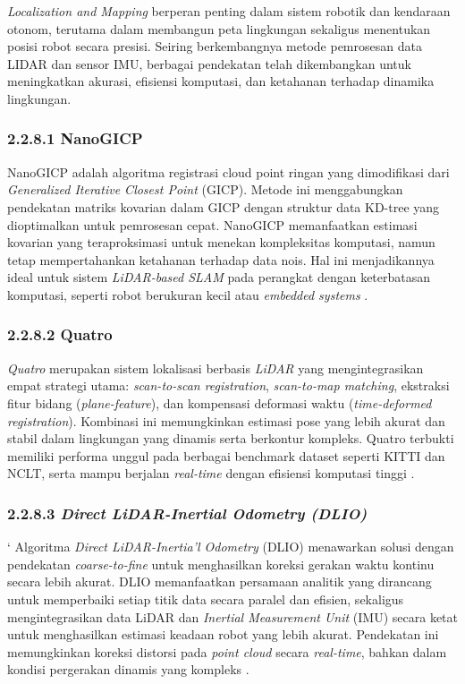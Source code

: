  \textit{ Localization and Mapping} berperan penting dalam sistem robotik dan kendaraan otonom, terutama dalam membangun peta lingkungan sekaligus menentukan posisi robot secara presisi. Seiring berkembangnya metode pemrosesan data LIDAR dan sensor IMU, berbagai pendekatan telah dikembangkan untuk meningkatkan akurasi, efisiensi komputasi, dan ketahanan terhadap dinamika lingkungan. 

\subsubsection{2.2.8.1 NanoGICP}

NanoGICP adalah algoritma registrasi cloud point ringan yang dimodifikasi dari \emph{Generalized Iterative Closest Point} (GICP). Metode ini menggabungkan pendekatan matriks kovarian dalam GICP dengan struktur data KD-tree yang dioptimalkan untuk pemrosesan cepat. NanoGICP memanfaatkan estimasi kovarian yang teraproksimasi untuk menekan kompleksitas komputasi, namun tetap mempertahankan ketahanan terhadap data nois. Hal ini menjadikannya ideal untuk sistem \emph{LiDAR-based SLAM} pada perangkat dengan keterbatasan komputasi, seperti robot berukuran kecil atau \emph{embedded systems} \cite{koide2021nanogicp}.


\subsubsection{2.2.8.2 Quatro}

\emph{Quatro} merupakan sistem lokalisasi berbasis \emph{LiDAR} yang mengintegrasikan empat strategi utama: \emph{scan-to-scan registration}, \emph{scan-to-map matching}, ekstraksi fitur bidang (\emph{plane-feature}), dan kompensasi deformasi waktu (\emph{time-deformed registration}). Kombinasi ini memungkinkan estimasi pose yang lebih akurat dan stabil dalam lingkungan yang dinamis serta berkontur kompleks. Quatro terbukti memiliki performa unggul pada berbagai benchmark dataset seperti KITTI dan NCLT, serta mampu berjalan \emph{real-time} dengan efisiensi komputasi tinggi \cite{kim2022quatro}.

\subsubsection{2.2.8.3 \emph{Direct LiDAR-Inertial Odometry (DLIO)}}`
Algoritma \emph{Direct LiDAR-Inertia'l Odometry} (DLIO) menawarkan solusi dengan pendekatan \emph{coarse-to-fine} untuk menghasilkan koreksi gerakan waktu kontinu secara lebih akurat. DLIO memanfaatkan persamaan analitik yang dirancang untuk memperbaiki setiap titik data secara paralel dan efisien, sekaligus mengintegrasikan data LiDAR dan \emph{Inertial Measurement Unit} (IMU) secara ketat untuk menghasilkan estimasi keadaan robot yang lebih akurat. Pendekatan ini memungkinkan koreksi distorsi pada \emph{point cloud} secara \emph{real-time}, bahkan dalam kondisi pergerakan dinamis yang kompleks \cite{chen2022dlio}.


